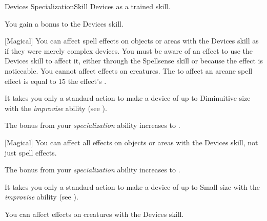     \begin{feat}{Devices Specialization}{Skill}
        \featpre Devices as a trained skill.

         You gain a  bonus to the Devices skill.

        [Magical] You can affect spell effects on objects or areas with the Devices skill as if they were merely complex devices.
        You must be aware of an effect to use the Devices skill to affect it, either through the Spellsense skill or because the effect is noticeable.
        You cannot affect effects on creatures.
        The  to affect an arcane spell effect is equal to 15 \add the effect's .

         It takes you only a standard action to make a device of up to Diminuitive size with the \textit{improvise} ability (see ).

         The bonus from your \textit{specialization} ability increases to .
        
        [Magical] You can affect all  effects on objects or areas with the Devices skill, not just spell effects.

         The bonus from your \textit{specialization} ability increases to .

         It takes you only a standard action to make a device of up to Small size with the \textit{improvise} ability (see ).

         You can affect  effects on creatures with the Devices skill.
    \end{feat}


